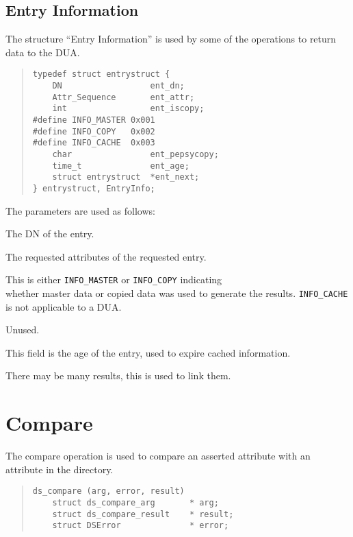 \subsection {Entry Information}
\label{einfo}

The structure ``Entry Information'' is used by some of the operations to
return data to the DUA.

\begin{quote}\small\begin{verbatim}
typedef struct entrystruct { 
    DN                  ent_dn;
    Attr_Sequence       ent_attr;
    int                 ent_iscopy;
#define INFO_MASTER 0x001
#define INFO_COPY   0x002
#define INFO_CACHE  0x003
    char                ent_pepsycopy;
    time_t              ent_age;
    struct entrystruct  *ent_next;
} entrystruct, EntryInfo;
\end{verbatim}\end{quote}

The parameters are used as follows:
\begin{describe}
\item [\verb"ent\_dn":] The DN of the entry.
\item [\verb"ent\_attr":] The requested attributes of the requested entry.
\item [\verb"ent\_iscopy":] This is either \verb"INFO_MASTER" or
\verb"INFO_COPY" indicating\\ whether master data or
copied data was used to generate the results.
\verb"INFO_CACHE" is not applicable to a DUA.
\item [\verb"ent\_pepsycopy":] Unused.
\item [\verb"ent\_age":] This field is the age of the entry, used to expire 
cached information.
\item [\verb"ent\_next":] There may be many results, this is used to link them.
\end{describe}


\section {Compare}

The compare operation is used to compare an asserted attribute with an
attribute in the directory.

\begin{quote}\small\begin{verbatim}
ds_compare (arg, error, result)
    struct ds_compare_arg       * arg;    
    struct ds_compare_result    * result;
    struct DSError              * error;
\end{verbatim}\end{quote}

